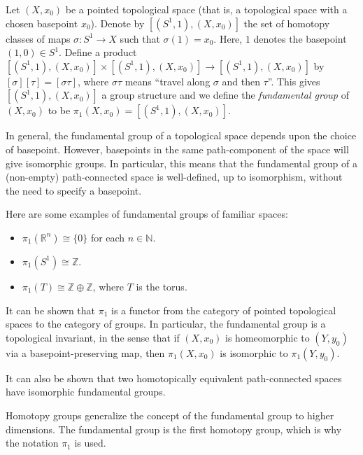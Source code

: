 \documentclass[12pt]{article}
\def\R{\mathbb{R}}
\def\N{\mathbb{N}}
\begin{document}

Let $(X,x_{0})$ be a pointed topological space (that is, a topological space with a chosen basepoint $x_{0}$).
Denote by $[(S^1,1),(X,x_{0})]$
the set of homotopy classes of maps $\sigma\colon S^{1} \to X$
such that $\sigma(1)=x_{0}$.
Here, $1$ denotes the basepoint $(1,0) \in S^{1}$.
Define a product
$[(S^1,1),(X,x_{0})] \times [(S^1,1),(X,x_{0})] \to [(S^1,1),(X,x_{0})]$
by $[\sigma][\tau]=[\sigma\tau]$,
where $\sigma\tau$ means ``travel along $\sigma$ and then $\tau$''.
This gives $[(S^1,1),(X,x_{0})]$ a group structure
and we define the \emph{fundamental group} of $(X,x_0)$
to be $\pi_1(X,x_{0})= [(S^1,1),(X,x_{0})]$.

In general, the fundamental group of a topological space
depends upon the choice of basepoint.
However, basepoints in the same path-component of the space
will give isomorphic groups.
In particular, this means that the fundamental group of a (non-empty) path-connected space is well-defined, up to isomorphism,
without the need to specify a basepoint.

Here are some examples of fundamental groups of familiar spaces: 
\begin{itemize}
\item $\pi_1(\R^n)\cong\{0\}$ for each $n\in\N$.
\item $\pi_1(S^1)\cong\mathbb{Z}$.
\item $\pi_1(T)\cong \mathbb{Z}\oplus\mathbb{Z}$, where $T$ is the torus.
\end{itemize}

It can be shown that $\pi_1$ is a functor
from the category of pointed topological spaces to the category of groups.
In particular, the fundamental group is a topological invariant,
in the sense that
if $(X,x_0)$ is homeomorphic to $(Y,y_0)$ via a basepoint-preserving map,
then $\pi_1(X,x_0)$ is isomorphic to $\pi_1(Y,y_{0})$. 

It can also be shown that two homotopically equivalent path-connected spaces
have isomorphic fundamental groups.

Homotopy groups generalize the concept of the fundamental group to higher dimensions.
The fundamental group is the first homotopy group,
which is why the notation $\pi_1$ is used.
\end{document}
